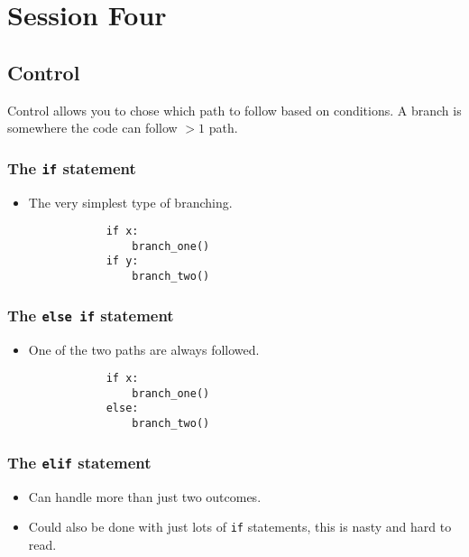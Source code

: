 \section{Session Four}\label{sec:session_four}

\subsection{Control}\label{sub:control}

Control allows you to chose which path to follow based on conditions.
A branch is somewhere the code can follow \(>1\) path.

\subsubsection{The \texttt{if} statement}\label{ssub:the-if-statement}

\begin{itemize}
	\item The very simplest type of branching.
	      \begin{verbatim}
            if x:
                branch_one()
            if y:
                branch_two()
        \end{verbatim}
\end{itemize}

\subsubsection{The \texttt{else if} statement}\label{ssub:the-else-if-statement}

\begin{itemize}
	\item One of the two paths are always followed.
	      \begin{verbatim}
            if x:
                branch_one()
            else:
                branch_two()
        \end{verbatim}
\end{itemize}

\subsubsection{The \texttt{elif} statement}\label{ssub:the-elif-statement}

\begin{itemize}
	\item Can handle more than just two outcomes.
	\item Could also be done with just lots of \texttt{if} statements, this is nasty and hard to read.
\end{itemize}

